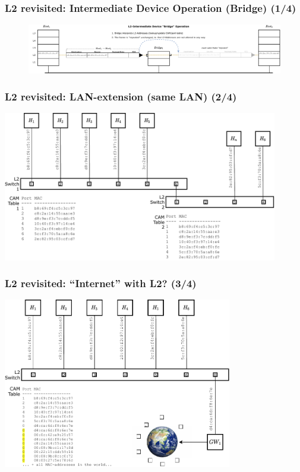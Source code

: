\documentclass{beamer}
\begin{document}
\begin{frame}
\frametitle{L2 revisited: Intermediate Device Operation (Bridge) (1/4)}
\begin{figure}
\centering
\includegraphics[width=12cm]{L2_intermediate-device}
\end{figure}
\end{frame}


\begin{frame}
\frametitle{L2 revisited: LAN-extension (same LAN) (2/4)}
\begin{centering}
\includegraphics[width=12cm]{L2-base-network.pdf}
\end{centering}
\end{frame}

\begin{frame}
\frametitle{L2 revisited: ``Internet'' with L2? (3/4)}
\includegraphics[width=10cm]{L2-base-network-L2-gateway.pdf}
\end{frame}
\end{document}
